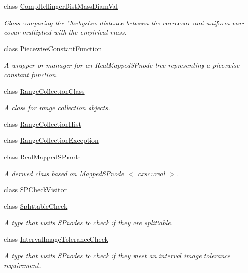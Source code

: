 \begin{DoxyCompactItemize}
class \hyperlink{classsubpavings_1_1CompHellingerDistMassDiamVal}{\-Comp\-Hellinger\-Dist\-Mass\-Diam\-Val}
\begin{DoxyCompactList}\small\item\em \-Class comparing the \-Chebyshev distance between the var-\/covar and uniform var-\/covar multiplied with the empirical mass. \end{DoxyCompactList}\item 
class \hyperlink{classsubpavings_1_1PiecewiseConstantFunction}{\-Piecewise\-Constant\-Function}
\begin{DoxyCompactList}\small\item\em \-A wrapper or manager for an \hyperlink{classsubpavings_1_1RealMappedSPnode}{\-Real\-Mapped\-S\-Pnode} tree representing a piecewise constant function. \end{DoxyCompactList}\item 
class \hyperlink{classsubpavings_1_1RangeCollectionClass}{\-Range\-Collection\-Class}
\begin{DoxyCompactList}\small\item\em \-A class for range collection objects. \end{DoxyCompactList}\item 
class \hyperlink{classsubpavings_1_1RangeCollectionHist}{\-Range\-Collection\-Hist}
\item 
class \hyperlink{classsubpavings_1_1RangeCollectionException}{\-Range\-Collection\-Exception}
\item 
class \hyperlink{classsubpavings_1_1RealMappedSPnode}{\-Real\-Mapped\-S\-Pnode}
\begin{DoxyCompactList}\small\item\em \-A derived class based on \hyperlink{classsubpavings_1_1MappedSPnode}{\-Mapped\-S\-Pnode} $<$ cxsc\-::real $>$. \end{DoxyCompactList}\item 
class \hyperlink{classsubpavings_1_1SPCheckVisitor}{\-S\-P\-Check\-Visitor}
\item 
class \hyperlink{classsubpavings_1_1SplittableCheck}{\-Splittable\-Check}
\begin{DoxyCompactList}\small\item\em \-A type that visits  \-S\-Pnodes to check if they are splittable. \end{DoxyCompactList}\item 
class \hyperlink{classsubpavings_1_1IntervalImageToleranceCheck}{\-Interval\-Image\-Tolerance\-Check}
\begin{DoxyCompactList}\small\item\em \-A type that visits  \-S\-Pnodes to check if they meet an interval image tolerance requirement. \end{DoxyCompactList}\item 

\end{DoxyCompactItemize}
